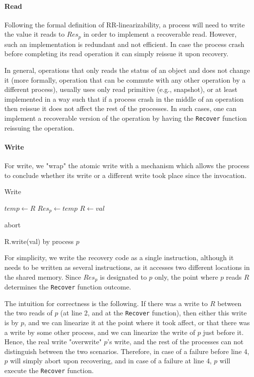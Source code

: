 \paragraph*{Read}

Following the formal definition of RR-linearizability, a process will need to write the value it reads to $Res_p$ in order to implement a recoverable read. However, such an implementation is redundant and not efficient. In case the process crash before completing its read operation it can simply reissue it upon recovery.

In general, operations that only reads the status of an object and does not change it (more formally, operation that can be commute with any other operation by a different process), usually uses only read primitive (e.g., snapshot), or at least implemented in a way such that if a process crash in the middle of an operation then reissue it does not affect the rest of the processes. In such cases, one can implement a recoverable version of the operation by having the \texttt{Recover} function reissuing the operation.

\paragraph*{Write}
For write, we "wrap" the atomic write with a mechanism which allows the process to conclude whether its write or a different write took place since the invocation.

\begin{algorithm}
	\caption{Write}\label{recoverable write}
	\begin{algorithmic}[1]	
		\State $temp \gets R$
		\State $Res_p \gets temp$
		\State $R \gets val$
		\EndProcedure
		
		 \Return abort
		\EndIf
		\EndProcedure
	\end{algorithmic}
	\caption{R.write(val) by process $p$}
\end{algorithm}

For simplicity, we write the recovery code as a single instruction, although it needs to be written as several instructions, as it accesses two different locations in the shared memory. Since $Res_p$ is designated to $p$ only, the point where $p$ reads $R$ determines the \texttt{Recover} function outcome.

The intuition for correctness is the following. If there was a write to $R$ between the two reads of $p$ (at line 2, and at the \texttt{Recover} function), then either this write is by $p$, and we can linearize it at the point where it took affect, or that there was a write by some other process, and we can linearize the write of $p$ just before it. Hence, the real write "overwrite" $p$'s write, and the rest of the processes can not distinguish between the two scenarios. Therefore, in case of a failure before line 4, $p$ will simply abort upon recovering, and in case of a failure at line 4, $p$ will execute the \texttt{Recover} function.


